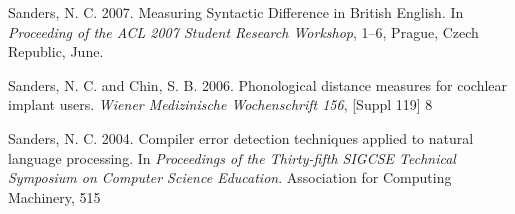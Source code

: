  Sanders, N. C. 2007. Measuring Syntactic Difference in British
  English. In \emph{Proceeding of the ACL 2007 Student Research
    Workshop}, 1--6, Prague, Czech Republic, June.

  Sanders, N. C. and Chin, S. B. 2006. Phonological distance measures for cochlear implant users. \emph{Wiener Medizinische Wochenschrift 156}, [Suppl 119] 8

 Sanders, N. C.  2004. Compiler error detection techniques applied to natural language processing. In \emph{Proceedings of the Thirty-fifth SIGCSE Technical Symposium on Computer Science Education}. Association for Computing Machinery, 515

